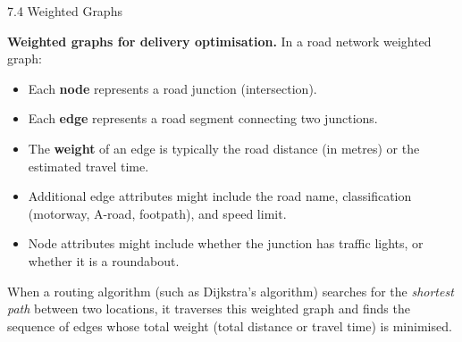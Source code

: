 \documentclass[aspectratio=169,10pt]{beamer}
\begin{document}
\begin{frame}[allowframebreaks]{7.4 Weighted Graphs}
  \framebreak

  \textbf{Weighted graphs for delivery optimisation.}
  In a road network weighted graph:
  \begin{itemize}
    \item Each \textbf{node} represents a road junction (intersection).
    \item Each \textbf{edge} represents a road segment connecting two junctions.
    \item The \textbf{weight} of an edge is typically the road distance
          (in metres) or the estimated travel time.
    \item Additional edge attributes might include the road name,
          classification (motorway, A-road, footpath), and speed limit.
    \item Node attributes might include whether the junction has traffic
          lights, or whether it is a roundabout.
  \end{itemize}

  When a routing algorithm (such as Dijkstra's algorithm) searches for
  the \emph{shortest path} between two locations, it traverses this
  weighted graph and finds the sequence of edges whose total weight
  (total distance or travel time) is minimised.

\end{frame}
\end{document}
